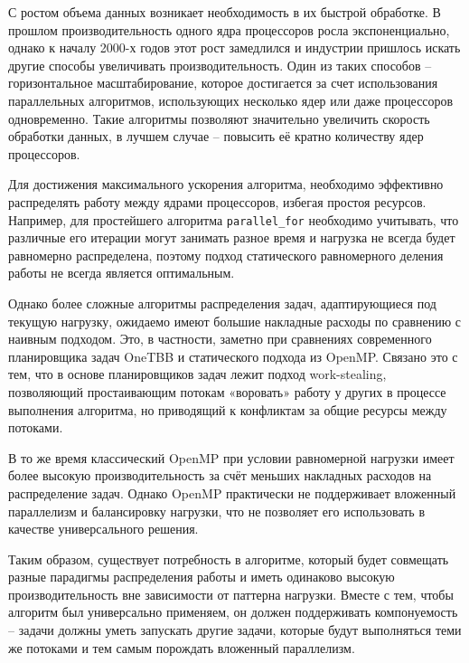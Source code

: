 \documentclass[times,specification,annotation]{itmo-student-thesis}
\begin{document}

\tableofcontents

\startprefacepage
С ростом объема данных возникает необходимость в их быстрой обработке. В прошлом производительность одного ядра процессоров росла экспоненциально, однако к началу 2000-х годов этот рост замедлился и индустрии пришлось искать другие способы увеличивать производительность. Один из таких способов -- горизонтальное масштабирование, которое достигается за счет использования параллельных алгоритмов, использующих несколько ядер или даже процессоров одновременно. Такие алгоритмы позволяют значительно увеличить скорость обработки данных, в лучшем случае -- повысить её кратно количеству ядер процессоров.

Для достижения максимального ускорения алгоритма, необходимо эффективно распределять работу между ядрами процессоров, избегая простоя ресурсов. Например, для простейшего алгоритма \texttt{parallel\_for} необходимо учитывать, что различные его итерации могут занимать разное время и нагрузка не всегда будет равномерно распределена, поэтому подход статического равномерного деления работы не всегда является оптимальным.

Однако более сложные алгоритмы распределения задач, адаптирующиеся под текущую нагрузку, ожидаемо имеют большие накладные расходы по сравнению с наивным подходом. Это, в частности, заметно при сравнениях современного планировщика задач OneTBB и статического подхода из OpenMP. Связано это с тем, что в основе планировщиков задач лежит подход work-stealing, позволяющий простаивающим потокам «воровать» работу у других в процессе выполнения алгоритма, но приводящий к конфликтам за общие ресурсы между потоками.

В то же время классический OpenMP при условии равномерной нагрузки имеет более высокую производительность за счёт меньших накладных расходов на распределение задач. Однако OpenMP практически не поддерживает вложенный параллелизм и балансировку нагрузки, что не позволяет его использовать в качестве универсального решения. 

Таким образом, существует потребность в алгоритме, который будет совмещать разные парадигмы распределения работы и иметь одинаково высокую производительность вне зависимости от паттерна нагрузки. Вместе с тем, чтобы алгоритм был универсально применяем, он должен поддерживать компонуемость -- задачи должны уметь запускать другие задачи, которые будут выполняться теми же потоками и тем самым порождать вложенный параллелизм.
\end{document}
